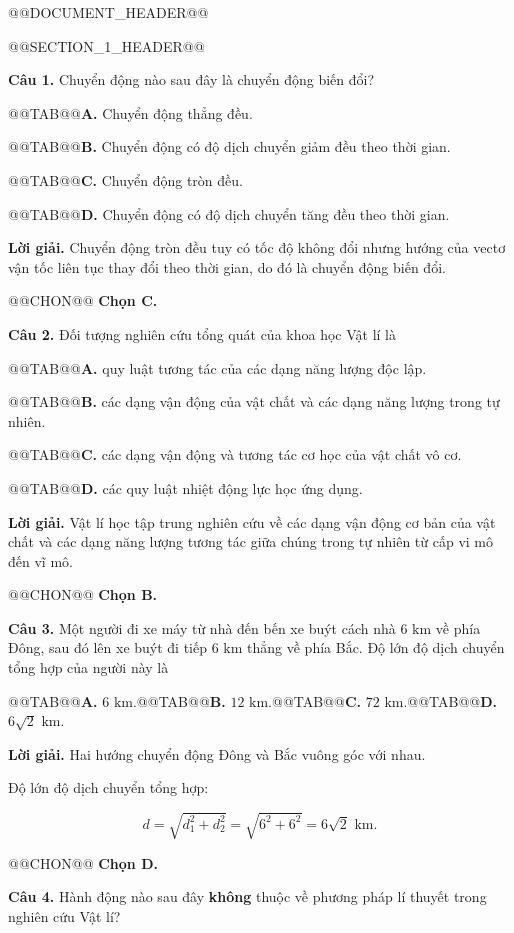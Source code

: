 \documentclass{article}
\begin{document}
@@DOCUMENT_HEADER@@

@@SECTION_1_HEADER@@

\textbf{Câu 1.} Chuyển động nào sau đây là chuyển động biến đổi?

@@TAB@@\textbf{A.} Chuyển động thẳng đều.

@@TAB@@\textbf{B.} Chuyển động có độ dịch chuyển giảm đều theo thời gian.

@@TAB@@\textbf{C.} Chuyển động tròn đều.

@@TAB@@\textbf{D.} Chuyển động có độ dịch chuyển tăng đều theo thời gian.

\textbf{Lời giải.} Chuyển động tròn đều tuy có tốc độ không đổi nhưng hướng của vectơ vận tốc liên tục thay đổi theo thời gian, do đó là chuyển động biến đổi.

@@CHON@@ \textbf{Chọn C.}

\textbf{Câu 2.} Đối tượng nghiên cứu tổng quát của khoa học Vật lí là

@@TAB@@\textbf{A.} quy luật tương tác của các dạng năng lượng độc lập.

@@TAB@@\textbf{B.} các dạng vận động của vật chất và các dạng năng lượng trong tự nhiên.

@@TAB@@\textbf{C.} các dạng vận động và tương tác cơ học của vật chất vô cơ.

@@TAB@@\textbf{D.} các quy luật nhiệt động lực học ứng dụng.

\textbf{Lời giải.} Vật lí học tập trung nghiên cứu về các dạng vận động cơ bản của vật chất và các dạng năng lượng tương tác giữa chúng trong tự nhiên từ cấp vi mô đến vĩ mô.

@@CHON@@ \textbf{Chọn B.}

\textbf{Câu 3.} Một người đi xe máy từ nhà đến bến xe buýt cách nhà $6\text{ km}$ về phía Đông, sau đó lên xe buýt đi tiếp $6\text{ km}$ thẳng về phía Bắc. Độ lớn độ dịch chuyển tổng hợp của người này là

@@TAB@@\textbf{A.} $6\text{ km}$.@@TAB@@\textbf{B.} $12\text{ km}$.@@TAB@@\textbf{C.} $72\text{ km}$.@@TAB@@\textbf{D.} $6\sqrt{2}\text{ km}$.

\textbf{Lời giải.} Hai hướng chuyển động Đông và Bắc vuông góc với nhau.

Độ lớn độ dịch chuyển tổng hợp:

\[d = \sqrt{d_1^2 + d_2^2} = \sqrt{6^2 + 6^2} = 6\sqrt{2}\text{ km}.\]

@@CHON@@ \textbf{Chọn D.}

\textbf{Câu 4.} Hành động nào sau đây \textbf{không} thuộc về phương pháp lí thuyết trong nghiên cứu Vật lí?
\end{document}
